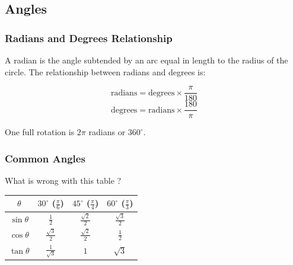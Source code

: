 \subsection{Angles}

\subsubsection{Radians and Degrees Relationship}

A radian is the angle subtended by an arc equal in length to the radius of the circle. The relationship between radians and degrees is:

\[
    \text{radians} = \text{degrees} \times \frac{\pi}{180}
\]
\[
    \text{degrees} = \text{radians} \times \frac{180}{\pi}
\]

One full rotation is $2\pi$ radians or $360^\circ$.

\subsubsection{Common Angles}

What is wrong with this table ?

\begin{table}[H]
    \begin{center}
        \begin{tabular}[c]{|c|c|c|c|}
            \hline
            $\theta$ & $30^\circ$ ($\frac{\pi}{6}$) & $45^\circ$ ($\frac{\pi}{4}$) & $60^\circ$ ($\frac{\pi}{3}$) \\
            \hline
            $\sin\theta$ & $\frac{1}{2}$ & $\frac{\sqrt{2}}{2}$ & $\frac{\sqrt{3}}{2}$ \\
            \hline
            $\cos\theta$ & $\frac{\sqrt{3}}{2}$ & $\frac{\sqrt{2}}{2}$ & $\frac{1}{2}$ \\
            \hline
            $\tan\theta$ & $\frac{1}{\sqrt{3}}$ & $1$ & $\sqrt{3}$ \\
            \hline
        \end{tabular}
    \end{center}
\end{table}
